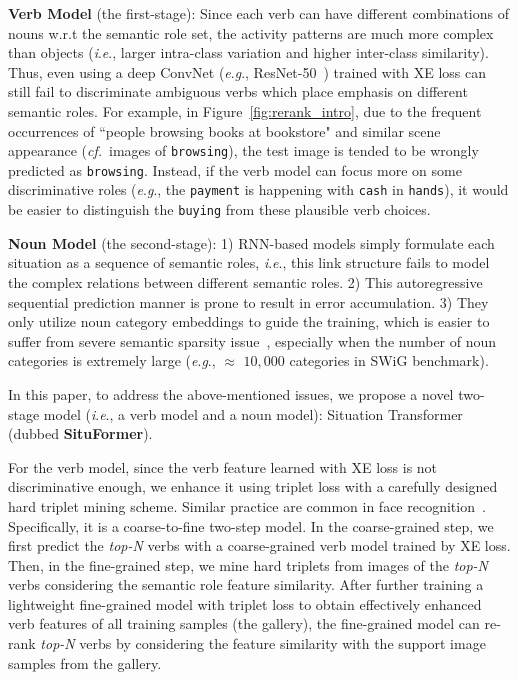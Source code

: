 \documentclass[letterpaper]{article} \usepackage{aaai22}  \usepackage{times}  \usepackage{helvet}  \usepackage{courier}  \usepackage[hyphens]{url}  \usepackage{graphicx} \urlstyle{rm} \def\UrlFont{\rm}  \usepackage{natbib}  \usepackage{caption} \DeclareCaptionStyle{ruled}{labelfont=normalfont,labelsep=colon,strut=off} \frenchspacing  \setlength{\pdfpagewidth}{8.5in}  \setlength{\pdfpageheight}{11in}
\newcommand{\ie}{\textit{i}.\textit{e}.}
\newcommand{\eg}{\textit{e}.\textit{g}.}
\newcommand{\cf}{\textit{cf.}}
\begin{document}
\noindent\textbf{Verb Model} (the first-stage): Since each verb can have different combinations of nouns w.r.t the semantic role set, the activity patterns are much more complex than objects (\ie, larger intra-class variation and higher inter-class similarity). Thus, even using a deep ConvNet  (\eg, ResNet-50~\cite{he2016deep}) trained with XE loss can still fail to discriminate ambiguous verbs which place emphasis on different semantic roles. For example, in Figure~\ref{fig:rerank_intro}, due to the frequent occurrences of ``people browsing books at bookstore" and similar scene appearance (\cf~images of \texttt{browsing}), the test image is tended to be wrongly predicted as \texttt{browsing}. Instead, if the verb model can focus more on some discriminative roles (\eg, the \texttt{payment} is happening with \texttt{cash} in \texttt{hands}), it would be easier to distinguish the \texttt{buying} from these plausible verb choices.




















\noindent\textbf{Noun Model} (the second-stage): 1) RNN-based models simply formulate each situation as a sequence of semantic roles, \ie, this link structure fails to model the complex relations between different semantic roles. 2) This autoregressive sequential prediction manner is prone to result in error accumulation. 3) They only utilize noun category embeddings to guide the training, which is easier to suffer from severe semantic sparsity issue~\cite{yatskar2017commonly}, especially when the number of noun categories is extremely large (\eg, $\approx$ $10,000$ categories in SWiG benchmark).


In this paper, to address the above-mentioned issues, we propose a novel two-stage model (\ie, a verb model and a noun model): Situation Transformer (dubbed \textbf{SituFormer}).

For the verb model, since the verb feature learned with XE loss is not discriminative enough, we enhance it using triplet loss with a carefully designed hard triplet mining scheme. Similar practice are common in face recognition~\cite{schroff2015facenet,wen2016discriminative}. Specifically, it is a coarse-to-fine two-step model. In the coarse-grained step, we first predict the \emph{top-N} verbs with a coarse-grained verb model trained by XE loss. Then, in the fine-grained step, we mine hard triplets from images of the \emph{top-N} verbs considering the semantic role feature similarity. After further training a lightweight fine-grained model with triplet loss to obtain effectively enhanced verb features of all training samples (the gallery), the fine-grained model can re-rank \emph{top-N} verbs by considering the feature similarity with the support image samples from the gallery.
\end{document}
